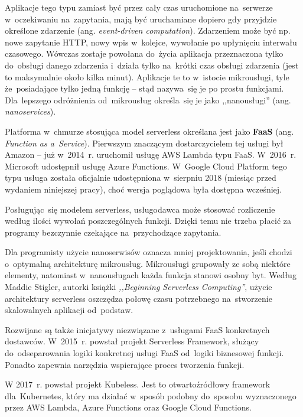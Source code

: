 \documentclass[12pt,a4paper,twoside,titlepage,openright]{book}
\begin{document}
Aplikacje tego typu zamiast być przez cały czas uruchomione na~serwerze w~oczekiwaniu na~zapytania, mają być uruchamiane dopiero gdy przyjdzie określone zdarzenie (ang. \textit{event-driven computation}). Zdarzeniem może być np. nowe zapytanie HTTP, nowy wpis w~kolejce, wywołanie po upłynięciu interwału czasowego. Wówczas zostaje powołana do~życia aplikacja przeznaczona tylko do~obsługi danego zdarzenia i~działa tylko na~krótki czas obsługi zdarzenia (jest to maksymalnie około kilka minut). Aplikacje te to w~istocie mikrousługi, tyle że~posiadające tylko jedną funkcję -- stąd nazywa~się je po prostu funkcjami. Dla~lepszego odróżnienia od~mikrousług określa~się je jako ,,nanousługi'' (ang. \textit{nanoservices}). \cite{serverlessMaddie, ccResearchSpringer, distributedSystems}

Platforma w~chmurze stosująca model serverless określana jest jako \textbf{FaaS} (ang. \textit{Function as a~Service}). Pierwszym znaczącym dostarczycielem tej usługi był Amazon -- już w~2014~r. uruchomił usługę AWS Lambda typu FaaS. W~2016~r. Microsoft udostępnił usługę Azure Functions. W~Google Cloud Platform tego typu usługa została oficjalnie udostępniona w~sierpniu 2018 (miesiąc przed wydaniem niniejszej pracy), choć wersja poglądowa była dostępna wcześniej. 

Posługując~się modelem serverless, usługodawca może stosować rozliczenie według ilości wywołań poszczególnych funkcji. Dzięki temu nie trzeba płacić za programy bezczynnie czekające na~przychodzące zapytania.

Dla programisty użycie nanoserwisów oznacza mniej projektowania, jeśli chodzi o~optymalną architekturę mikrousług. Mikrousługi grupowały ze sobą niektóre elementy, natomiast w~nanousługach każda funkcja stanowi osobny byt. Według Maddie Stigler, autorki książki \textit{,,Beginning Serverless Computing''}, użycie architektury serverless oszczędza połowę czasu potrzebnego na~stworzenie skalowalnych aplikacji od~podstaw.\cite{serverlessMaddie}

Rozwijane są także inicjatywy niezwiązane z~usługami FaaS konkretnych dostawców. W~2015~r. powstał projekt Serverless Framework,\cite{siteServerlessFramework} służący do~odseparowania logiki konkretnej usługi FaaS od~logiki biznesowej funkcji. Ponadto zapewnia narzędzia wspierające proces tworzenia funkcji. 

W 2017~r. powstał projekt Kubeless.\cite{siteKubelessReleases} Jest to otwartoźródłowy framework dla~Kubernetes, który ma działać w~sposób podobny do~sposobu wyznaczonego przez AWS Lambda, Azure Functions oraz Google Cloud Functions.\cite{distributedSystems} 
\end{document}
